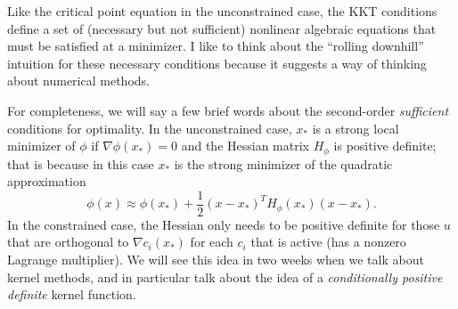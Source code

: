 \documentclass[12pt, leqno]{article} %
\begin{document}
Like the critical point equation in the unconstrained case, the KKT
conditions define a set of (necessary but not sufficient) nonlinear
algebraic equations that must be satisfied at a minimizer.  I like to
think about the ``rolling downhill'' intuition for these necessary
conditions because it suggests a way of thinking about numerical
methods.

For completeness, we will say a few brief words about
the second-order {\em sufficient} conditions for optimality.
In the unconstrained case, $x_*$ is a strong
local minimizer of $\phi$ if $\nabla \phi(x_*) = 0$ and
the Hessian matrix $H_{\phi}$ is positive definite; that is because
in this case $x_*$ is the strong minimizer of the quadratic approximation
\[
  \phi(x) \approx \phi(x_*) + \frac{1}{2} (x-x_*)^T H_\phi(x_*) (x-x_*).
\]
In the constrained case, the Hessian only needs to be positive
definite for those $u$ that are orthogonal to $\nabla c_i(x_*)$
for each $c_i$ that is active (has a nonzero Lagrange multiplier).
We will see this idea in two weeks when we talk about kernel methods,
and in particular talk about the idea of
a {\em conditionally positive definite} kernel function.



\end{document}

